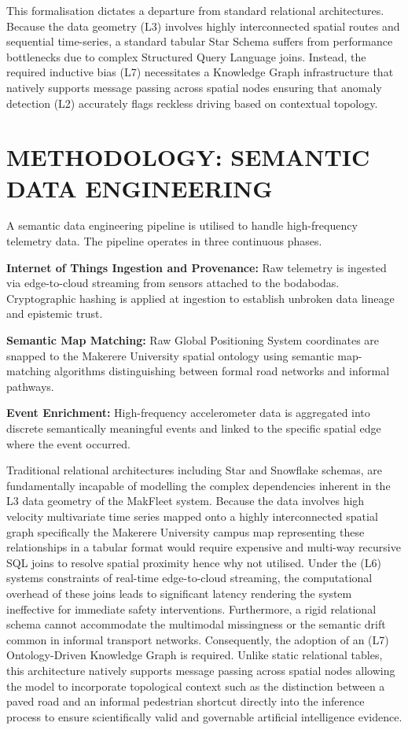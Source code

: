 \documentclass{ieeeaccess}
\begin{document}
This formalisation dictates a departure from standard relational
architectures. Because the data geometry (L3) involves highly interconnected spatial routes and sequential time-series, a standard
tabular Star Schema suffers from performance bottlenecks due to complex Structured Query Language joins. Instead, the required inductive bias (L7) necessitates a Knowledge Graph infrastructure that natively supports message passing across spatial nodes ensuring that anomaly detection (L2) accurately flags reckless driving based on contextual topology.


\section{METHODOLOGY: SEMANTIC DATA ENGINEERING}
\label{sec:methodology}

A semantic data engineering pipeline is utilised to handle high-frequency telemetry data. The pipeline operates in three continuous phases.

\textbf{Internet of Things Ingestion and Provenance:} Raw telemetry is ingested via
edge-to-cloud streaming from sensors attached to the bodabodas. Cryptographic hashing is applied at ingestion to establish unbroken data lineage and epistemic trust.

\textbf{Semantic Map Matching:} Raw Global Positioning System coordinates are snapped to the
Makerere University spatial ontology using semantic map-matching algorithms distinguishing between formal road networks and informal
pathways.

\textbf{Event Enrichment:} High-frequency accelerometer data is aggregated into discrete semantically meaningful events and linked to
the specific spatial edge where the event occurred.

Traditional relational architectures including Star and Snowflake
schemas, are fundamentally incapable of modelling the complex dependencies inherent in the L3 data geometry of the MakFleet system.
Because the data involves high velocity multivariate time series mapped
onto a highly interconnected spatial graph specifically the Makerere University campus map representing these relationships in a tabular
format would require expensive and multi-way recursive SQL joins to resolve
spatial proximity hence why not utilised. Under the (L6) systems constraints of real-time
edge-to-cloud streaming, the computational overhead of these joins leads to significant latency rendering the system ineffective for immediate safety interventions. Furthermore, a rigid relational schema cannot accommodate the multimodal missingness or the semantic drift common in informal transport networks. Consequently, the adoption of an (L7)
Ontology-Driven Knowledge Graph is required. Unlike static relational
tables, this architecture natively supports message passing across
spatial nodes allowing the model to incorporate topological context such as the distinction between a paved road and an informal pedestrian
shortcut directly into the inference process to ensure scientifically valid and governable artificial intelligence evidence.
\end{document}
